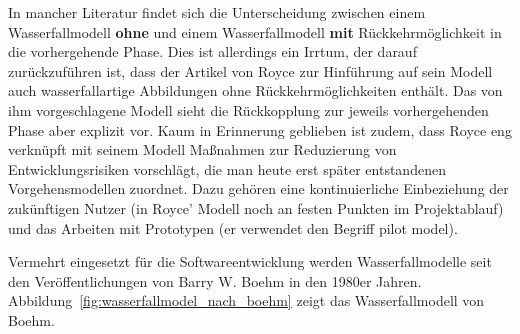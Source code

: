 \pagebreak %

In mancher Literatur findet sich die Unterscheidung zwischen einem Wasserfall\-modell \textbf{ohne} und einem Wasserfallmodell \textbf{mit} Rückkehrmöglichkeit in die vorhergehende Phase. Dies ist allerdings ein Irrtum, der darauf zurückzuführen ist, dass der Artikel von Royce zur Hinführung auf sein Modell auch wasserfallartige Abbildungen ohne Rückkehrmöglichkeiten enthält. Das von ihm vorgeschlagene Modell sieht die Rückkopplung zur jeweils vorhergehenden Phase aber explizit vor. Kaum in Erinnerung geblieben ist zudem, dass Royce eng verknüpft mit seinem Modell Maßnahmen zur Reduzierung von Entwicklungsrisiken vorschlägt, die man heute erst später entstandenen Vorgehensmodellen zuordnet. Dazu gehören eine kontinuier\-liche Einbeziehung der zukünftigen Nutzer (in Royce' Modell noch an festen Punkten im Projektablauf) und das Arbeiten mit Prototypen 
(er verwendet den Begriff pilot model).

Vermehrt eingesetzt für die Softwareentwicklung werden Wasserfallmodelle seit den Veröffentlichungen von Barry W. Boehm  in den 1980er Jahren. Abbildung~\ref{fig:wasserfallmodel_nach_boehm} zeigt das Wasserfallmodell von Boehm.  

